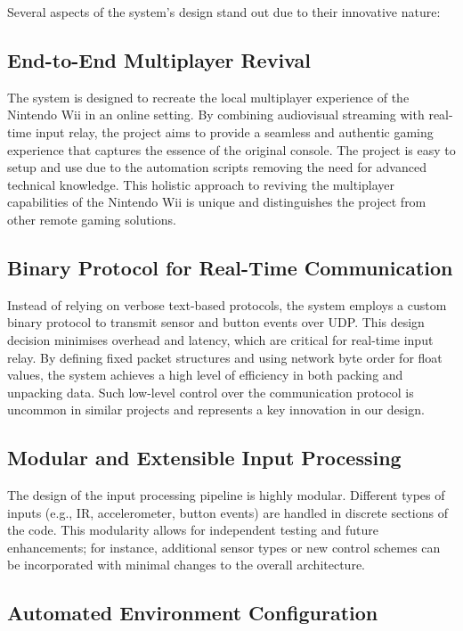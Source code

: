 Several aspects of the system’s design stand out due to their innovative nature:

\subsection*{End-to-End Multiplayer Revival}

The system is designed to recreate the local multiplayer experience of the Nintendo Wii in an online setting. By combining audiovisual streaming with real-time input relay, the project aims to provide a seamless and authentic gaming experience that captures the essence of the original console. The project is easy to setup and use due to the automation scripts removing the need for advanced technical knowledge. This holistic approach to reviving the multiplayer capabilities of the Nintendo Wii is unique and distinguishes the project from other remote gaming solutions.


\subsection*{Binary Protocol for Real-Time Communication}

Instead of relying on verbose text-based protocols, the system employs a custom binary protocol to transmit sensor and button events over UDP. This design decision minimises overhead and latency, which are critical for real-time input relay. By defining fixed packet structures and using network byte order for float values, the system achieves a high level of efficiency in both packing and unpacking data. Such low-level control over the communication protocol is uncommon in similar projects and represents a key innovation in our design.

\subsection*{Modular and Extensible Input Processing}

The design of the input processing pipeline is highly modular. Different types of inputs (e.g., IR, accelerometer, button events) are handled in discrete sections of the code. This modularity allows for independent testing and future enhancements; for instance, additional sensor types or new control schemes can be incorporated with minimal changes to the overall architecture.

\subsection*{Automated Environment Configuration}

